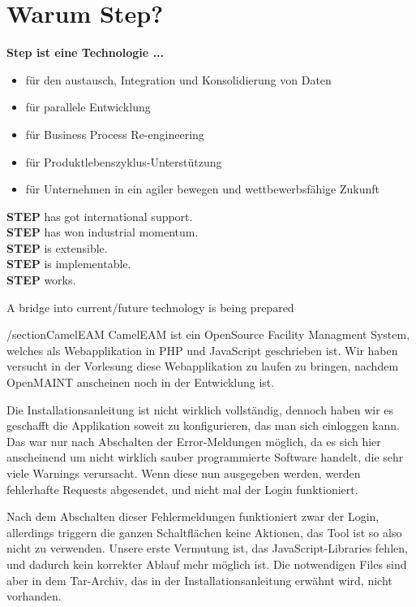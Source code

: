 \newpage\section{Warum Step?}

\textbf{Step ist eine Technologie ...}

\begin{itemize}
\item für den austausch, Integration und Konsolidierung von Daten
\item für parallele Entwicklung
\item für Business Process Re-engineering 
\item für Produktlebenszyklus-Unterstützung 
\item für Unternehmen in ein agiler bewegen und wettbewerbsfähige Zukunft
\end{itemize}

\textbf{STEP} has got international support. \\
\textbf{STEP} has won industrial momentum.  \\
\textbf{STEP} is extensible.  \\
\textbf{STEP} is implementable.  \\
\textbf{STEP} works.
 
A bridge into current/future technology is being prepared 

/section{CamelEAM}
CamelEAM ist ein OpenSource Facility Managment System, welches als Webapplikation in PHP und JavaScript geschrieben ist. Wir haben versucht in der Vorlesung diese Webapplikation zu laufen zu bringen, nachdem OpenMAINT anscheinen noch in der Entwicklung ist.

Die Installationsanleitung ist nicht wirklich vollständig, dennoch haben wir es geschafft die Applikation soweit zu konfigurieren, das man sich einloggen kann. Das war nur nach Abschalten der Error-Meldungen möglich, da es sich hier anscheinend um nicht wirklich sauber programmierte Software handelt, die sehr viele Warnings verursacht. Wenn diese nun ausgegeben werden, werden fehlerhafte Requests abgesendet, und nicht mal der Login funktioniert.

Nach dem Abschalten dieser Fehlermeldungen funktioniert zwar der Login, allerdings triggern die ganzen Schaltflächen keine Aktionen, das Tool ist so also nicht zu verwenden. Unsere erste Vermutung ist, das JavaScript-Libraries fehlen, und dadurch kein korrekter Ablauf mehr möglich ist. Die notwendigen Files sind aber in dem Tar-Archiv, das in der Installationsanleitung erwähnt wird, nicht vorhanden.

